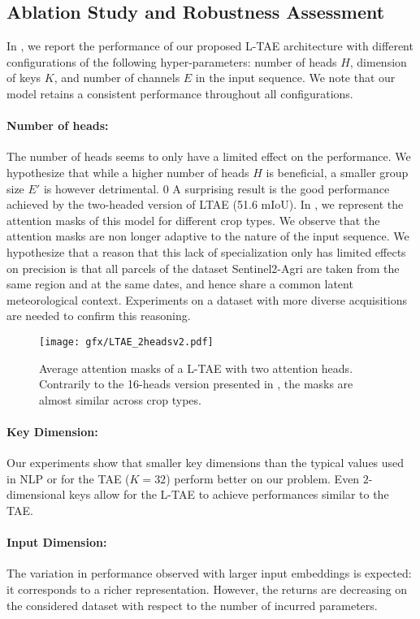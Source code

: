\documentclass[runningheads]{llncs}
\begin{document}
\subsection{Ablation Study and Robustness Assessment}
In , we report the performance of our proposed L-TAE architecture with different configurations of the following hyper-parameters: number of heads $H$, dimension of keys $K$, and number of channels $E$ in the input sequence. We note that our model retains a consistent performance throughout all configurations.\paragraph{Number of heads:} 
The number of heads seems to only have a limited effect on the performance. We hypothesize that while a higher number of heads $H$ is beneficial, a smaller group size $E'$ is however detrimental. 
 0
A surprising result is the good performance achieved by the two-headed version of LTAE (51.6 mIoU). 
In , we represent the attention masks of this model for different crop types. We observe that the attention masks are non longer adaptive to the nature of the input sequence. 
We hypothesize that a reason that this lack of specialization only has limited effects on precision is that all parcels of the dataset Sentinel2-Agri are taken from the same region and at the same dates, and hence share a common latent meteorological context. Experiments on a  dataset with more diverse acquisitions are needed to confirm this reasoning.
\begin{figure}
    \centering
    \texttt{[image: gfx/LTAE\_2headsv2.pdf]}
    \caption{Average attention masks of a L-TAE with two attention heads.
    Contrarily to the 16-heads version presented in , the  masks are almost similar across crop types.
}
    \label{fig:2heads}
\end{figure}
\fi
\paragraph{Key Dimension:} Our experiments show that smaller key dimensions than the typical values used in NLP or for the TAE ($K=32$) perform better on our problem. Even $2$-dimensional keys allow for the L-TAE to achieve performances similar to the TAE.

\paragraph{Input Dimension:} The variation in performance observed with larger input embeddings is expected: it corresponds to a richer representation. However, the returns are decreasing on the considered dataset with respect to the number of incurred parameters.
\end{document}
